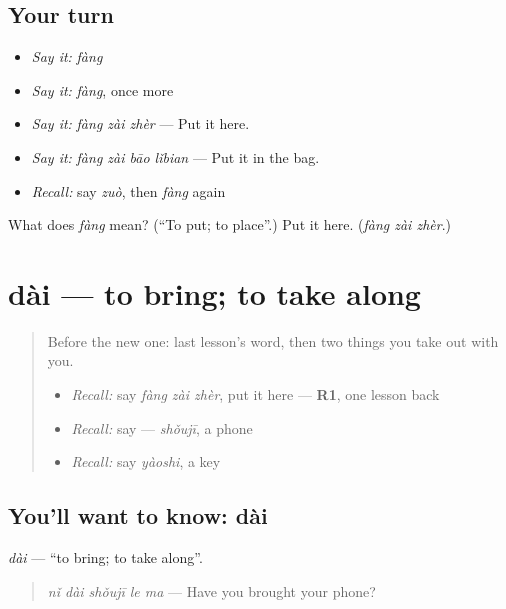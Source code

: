 \subsection*{Your turn}
\begin{itemize}
\raggedright
  \item \emph{Say it:} \emph{fàng}
  \item \emph{Say it:} \emph{fàng}, once more
  \item \emph{Say it:} \emph{fàng zài zhèr} — Put it here.
  \item \emph{Say it:} \emph{fàng zài bāo lǐbian} — Put it in the bag.
  \item \emph{Recall:} say \emph{zuò}, then \emph{fàng} again
\end{itemize}

\begin{tcolorbox}[breakable,colback=teal!4,colframe=teal!35!black,title={Before you move on}]
What does \emph{fàng} mean? (\textquotedblleft{}To put; to place\textquotedblright{}.) Put it here. (\emph{fàng zài zhèr}.)
\end{tcolorbox}
\section[dài]{dài — to bring; to take along}

\label{lesson:ZH-C89-dai}



\begin{quote}
Before the new one: last lesson's word, then two things you take out with you.

\begin{itemize}
\raggedright
  \item \emph{Recall:} say \emph{fàng zài zhèr}, put it here — \textbf{R1}, one lesson back
  \item \emph{Recall:} say  — \emph{shǒujī}, a phone
  \item \emph{Recall:} say \emph{yàoshi}, a key
\end{itemize}
\end{quote}

\subsection*{You'll want to know: dài}
\emph{dài} — \textquotedblleft{}to bring; to take along\textquotedblright{}.

\begin{quote}
\emph{nǐ dài shǒujī le ma} — Have you brought your phone?
\end{quote}

